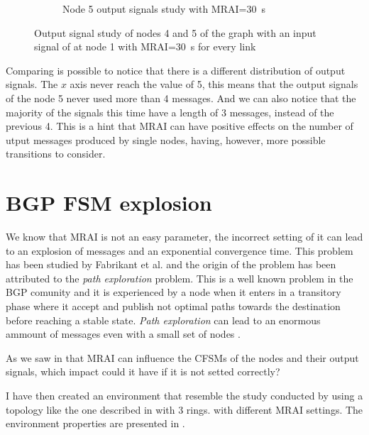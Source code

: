 \begin{figure}[h]
\begin{subfigure}[b]{0.45\textwidth}
		 \caption{Node \num{5} output signals study with \ac{MRAI}=\SI{30}{\second}}
         \label{fig:signal_node5_MRAI}
     \end{subfigure}
		\caption{Output signal study of nodes \num{4} and \num{5} of the graph 
			 with an input signal of  at node \num{1}
			with \ac{MRAI}=\SI{30}{\second} for every link}
        \label{fig:signal_griffin_fig4_MRAI}
\end{figure}

Comparing  is possible to notice
that there is a different distribution of output signals.
The $x$ axis never reach the value of \num{5}, this means that the output signals
of the node \num{5} never used more than \num{4} messages.
And we can also notice that the majority of the signals this time have a length
of \num{3} messages, instead of the previous \num{4}.
This is a hint that \ac{MRAI} can have positive effects on the number of utput messages
produced by single nodes, having, however, more possible transitions to consider.

\section{BGP FSM explosion}
\label{sec:bgp_fsm_explosion}

We know that \ac{MRAI} is not an easy parameter, the incorrect setting of
it can lead to an explosion of messages and an exponential convergence time.
This problem has been studied by Fabrikant et al. \cite{fabrikant2011there} and
the origin of the problem has been attributed to the \textit{path exploration}
problem.
This is a well known problem in the \ac{BGP} comunity and it is experienced
by a node when it enters in a transitory phase where it accept and publish not
optimal paths towards the destination before reaching a stable state.
\textit{Path exploration} can lead to an enormous ammount of messages even with
a small set of nodes \cite{deshpande2004impact}.

As we saw in  that \ac{MRAI} can influence the
\ac{CFSM}s of the nodes and their output signals, which impact could it have
if it is not setted correctly?

I have then created an environment that resemble the study conducted by
\cite{fabrikant2011there} using a topology like the one described in 
with \num{3} rings.
with different \ac{MRAI} settings.
The environment properties are presented in .

